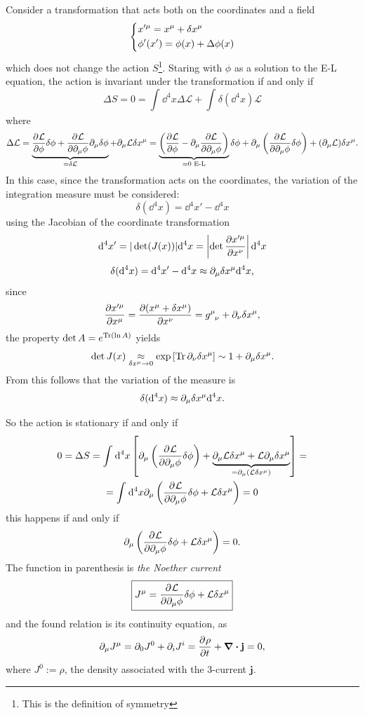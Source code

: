 Consider a transformation that acts both on the coordinates and a field
$$\begin{dcases*}
  x'^\mu = x^\mu + \delta x^\mu\\
  \phi'(x')=\phi(x)+\Delta\phi(x)
  \end{dcases*}$$
which does not change the action $S$\footnote{This is the definition of symmetry}.
Staring with $\phi$ as a solution to the E-L equation, the action is invariant under
the transformation if and only if
$$\Delta S =0=\int_{}^{}\dd^4x\Delta\mathcal{L}+\int_{}^{}\delta(\dd^4x)\mathcal{L}$$
where
$$\Delta\mathcal{L} = \underbrace{\pdv[]{\mathcal{L}}{\phi}\delta\phi+
\pdv[]{\mathcal{L}}{\partial_\mu\phi}\partial_\mu\delta\phi}_{
= \delta\mathcal{L}} + \partial_\mu\mathcal{L}\delta x^\mu= \underbrace{\left(\pdv[]{
\mathcal{L}}{\phi} - \partial_\mu\pdv{\mathcal{L}}{\partial_\mu\phi}\right)}_{=0\text{ E-L}}
\delta\phi+\partial_\mu\left(\pdv[]{\mathcal{L}}{\partial_\mu\phi}\delta\phi\right)+
(\partial_\mu\mathcal{L})\delta x^\mu.$$
In this case, since the transformation acts on the coordinates, the variation of
the integration measure must be considered:
$$\delta(\dd^4x)= \dd^4x'-\dd^4x$$
using the Jacobian of the coordinate transformation
$$\dd^4x' = |\det(J(x))|\dd^4x = \left|\det\pdv{x'^\mu}{x^\nu}\right|\dd^4x$$
$$
\delta(\dd^4x)=\dd^4x'-\dd^4x\approx \partial_\mu\delta x^\mu\dd^4x,
$$
since
$$\pdv{x'^\mu}{x^\mu} = \pdv{(x^\mu+\delta x^\mu)}{x^\nu} = g\indices{^\mu_\nu}+
\pd_\nu\delta x^\mu,$$
the property $\det A=e^{\Tr(\ln A)}$ yields
$$\det J(x) \underset{\delta x^\mu\to0}\approx\exp\left[\Tr\partial_\nu\delta x^\mu\right]
\sim 1+\partial_\mu\delta x^\mu.$$
From this follows that the variation of the measure is
$$\delta(\dd^4x) \approx \partial_\mu\delta x^\mu\dd^4x.$$

So the action is stationary if and only if
\begin{gather*}
0 = \Delta S = \int_{}^{}\dd^4x \left[\partial_\mu\left(\pdv[]{\mathcal{L}}{\partial_\mu\phi}
\delta\phi\right)+\underbrace{\partial_\mu\mathcal{L}\delta x^\mu + \mathcal{L}\partial_\mu
\delta x^\mu}_{=\partial_\mu(\mathcal{L}\delta x^\mu)}\right] = \\
= \int_{}^{}\dd^4x \partial_\mu\left(\pdv[]{\mathcal{L}}{\partial_\mu\phi}\delta\phi+
\mathcal{L}\delta x^\mu\right) = 0
\end{gather*}
this happens if and only if
$$\partial_\mu\left(\pdv[]{\mathcal{L}}{\partial_\mu\phi}\delta\phi+
\mathcal{L}\delta x^\mu\right)= 0. $$
The function in parenthesis is \textit{the Noether current}
$$\boxed{J^\mu =\pdv[]{\mathcal{L}}{\partial_\mu\phi}\delta\phi+\mathcal{L}\delta
x^\mu}$$
and the found relation is its continuity equation, as
$$\pd_\mu J^\mu = \pd_0 J^0 + \pd_i J^i = \pdv[]{\rho}{t}+\divergence\mathbf{j}=0,$$
where $J^0:=\rho$, the density associated with the 3-current
$\mathbf{j}$.

